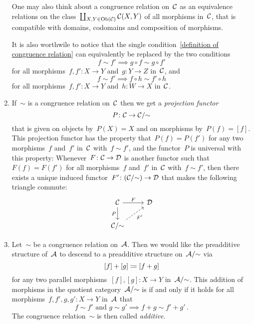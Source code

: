 \begin{remark*}
\begin{enumerate}
      One may also think about a congruence relation on~$\mathcal{C}$ as an equivalence relations on the class~$\coprod_{X, Y \in \operatorname{Ob}(\mathcal{C})} \mathcal{C}(X,Y)$ of all morphisms in~$\mathcal{C}$, that is compatible with domains, codomains and composition of morphisms.
      
      It is also worthwile to notice that the single condition~\eqref{definition of congruence relation} can equivalently be replaced by the two conditions
      \[
                  f \sim f'
        \implies  g \circ f \sim g \circ f'
      \]
      for all morphisms~$f, f' \colon X \to Y$ and~$g \colon Y \to Z$ in~$\mathcal{C}$, and
      \[
                  f \sim f'
        \implies  f \circ h \sim f' \circ h
      \]
      for all morphisms~$f, f' \colon X \to Y$ and~$h \colon W \to X$ in~$\mathcal{C}$.
    \item
      If~$\sim$ is a congruence relation on~$\mathcal{C}$ then we get a \emph{projection functor}
      \[
                P
        \colon  \mathcal{C}
        \to     \mathcal{C}/{\sim}
      \]
      that is given on objects by~$P(X) = X$ and on morphisms by~$P(f) = [f]$.
      This projection functor has the property that~$P(f) = P(f')$ for any two morphisms~$f$ and~$f'$ in~$\mathcal{C}$ with~$f \sim f'$, and the functor~$P$ is universal with this property:
      Whenever~$F \colon \mathcal{C} \to \mathcal{D}$ is another functor such that~$F(f) = F(f')$ for all morphisms~$f$ and~$f'$ in~$\mathcal{C}$ with~$f \sim f'$, then there exists a unique induced functor~$F' \colon (\mathcal{C}/{\sim}) \to \mathcal{D}$ that makes the following triangle commute:
      \[
        \begin{tikzcd}
            \Ccat
            \arrow{r}[above]{F}
            \arrow{d}[left]{P}
          & \Dcat
          \\
            \Ccat/{\sim}
            \arrow[dashed]{ur}[below right]{F'}
          & {}
        \end{tikzcd}
      \]
    \item
      Let~$\sim$ be a congruence relation on~$\mathcal{A}$.
      Then we would like the preadditive structure of~$\mathcal{A}$ to descend to a preadditive structure on~$\mathcal{A}/{\sim}$ via
      \[
                  [f] + [g]
        \coloneqq  [f + g]
      \]
      for any two parallel morphisms~$[f], [g] \colon X \to Y$ in~$\mathcal{A}/{\sim}$.
      This addition of morphisms in the quotient category~$\mathcal{A}/{\sim}$ is {\welldef} if and only if it holds for all morphisms~$f, f', g, g' \colon X \to Y$ in~$\mathcal{A}$ that
      \[
        \text{$f \sim f'$ and~$g \sim g'$}
        \implies
        f + g \sim f' + g' \,.
      \]
      The congruence relation~$\sim$ is then called \emph{additive}.
      

\end{enumerate}
\end{remark*}
